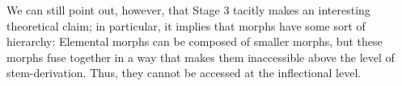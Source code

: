 
We can still point out, however, that Stage 3 tacitly makes an interesting theoretical claim; in particular, it implies that morphs have some sort of hierarchy: Elemental morphs can be composed of smaller morphs, but these morphs fuse together in a way that makes them inaccessible above the level of stem-derivation. Thus, they cannot be accessed at the inflectional level. %


